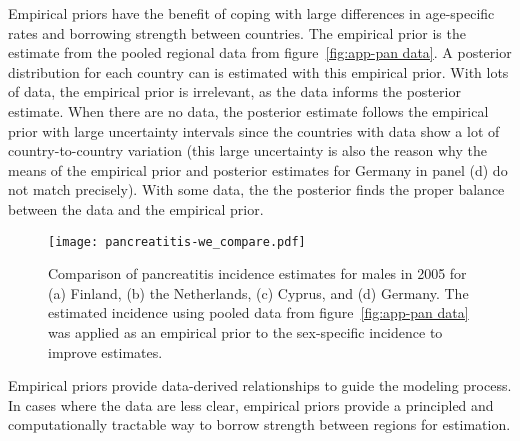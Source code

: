 Empirical priors have the benefit of coping with large differences in age-specific
rates and borrowing strength between countries.  The empirical prior is the
estimate from the pooled regional data from figure~\ref{fig:app-pan data}.  A
posterior distribution for each country can is estimated with this empirical prior.
With lots of data, the empirical prior is irrelevant, as the data informs the
posterior estimate.  When there are no data,
the posterior estimate follows the empirical prior with large
uncertainty intervals since the countries with data show a lot of
country-to-country variation (this large uncertainty is also the
reason why the means of the empirical prior and posterior estimates for Germany
in panel (d) do not match precisely).  With some data, the the posterior finds the
proper balance between the data and the empirical prior.

    \begin{figure}[h]
        \begin{center}
            \texttt{[image: pancreatitis-we\_compare.pdf]}
            \caption[Comparison of pancreatitis incidence estimates.]
             {Comparison of pancreatitis incidence estimates
              for males in 2005 for (a) Finland, (b) the Netherlands, (c)
              Cyprus, and (d) Germany.  The estimated incidence using
              pooled data from figure~\ref{fig:app-pan data} was
              applied as an empirical prior to the sex-specific
              incidence to improve estimates.}
            \label{fig:app-pan compare}
        \end{center}
    \end{figure}

Empirical priors provide data-derived relationships to guide the
modeling process.  In cases where the data are less clear, empirical
priors provide a principled and computationally tractable way to
borrow strength between regions for estimation. 